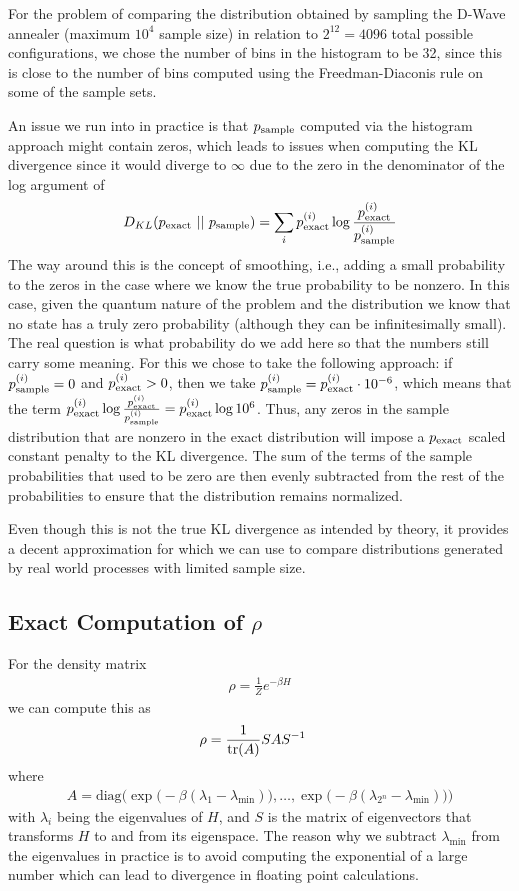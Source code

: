 For the problem of comparing the distribution obtained by sampling the D-Wave annealer (maximum \( 10^4 \) sample size) in relation to \( 2^{12} = 4096 \) total possible configurations, we chose the number of bins in the histogram to be 32, since this is close to the number of bins computed using the Freedman-Diaconis rule on some of the sample sets.

An issue we run into in practice is that \( p_{\text{sample}} \) computed via the histogram approach might contain zeros, which leads to issues when computing the KL divergence since it would diverge to \( \infty \) due to the zero in the denominator of the log argument of
\begin{align}
    D_{KL}(p_{\text{exact}} \ || \ p_{\text{sample}}) = \sum_i p_{\text{exact}}^{(i)} \log\frac{p_{\text{exact}}^{(i)}}{p_{\text{sample}}^{(i)}}
\end{align}
The way around this is the concept of smoothing, i.e., adding a small probability to the zeros in the case where we know the true probability to be nonzero.
In this case, given the quantum nature of the problem and the distribution we know that no state has a truly zero probability (although they can be infinitesimally small).
The real question is what probability do we add here so that the numbers still carry some meaning.
For this we chose to take the following approach: if \( p_{\text{sample}}^{(i)} = 0 \) and \( p_{\text{exact}}^{(i)} > 0 \), then we take \( p_{\text{sample}}^{(i)} = p_{\text{exact}}^{(i)} \cdot 10^{-6} \), which means that the term \( p_{\text{exact}}^{(i)} \log \frac{p_{\text{exact}}^{(i)}}{p_{\text{sample}}^{(i)}} = p_{\text{exact}}^{(i)} \log 10^6 \).
Thus, any zeros in the sample distribution that are nonzero in the exact distribution will impose a \( p_{\text{exact}} \) scaled constant penalty to the KL divergence.
The sum of the terms of the sample probabilities that used to be zero are then evenly subtracted from the rest of the probabilities to ensure that the distribution remains normalized.

Even though this is not the true KL divergence as intended by theory, it provides a decent approximation for which we can use to compare distributions generated by real world processes with limited sample size.

\subsection{Exact Computation of \( \rho \)}\label{app:exact_rho_computation}
For the density matrix
\begin{align}
    \rho = \frac{1}{Z} e^{-\beta H}
\end{align}
we can compute this as
\begin{align}
    \rho
        &= \frac{1}{\text{tr}(A)} S A S^{-1}
\end{align}
where
\begin{align}
    A = \text{diag}\Big(\exp\big(-\beta(\lambda_1 - \lambda_{\min})\big), \dots, \exp\big(-\beta(\lambda_{2^n} - \lambda_{\min})\big)\Big)
\end{align}
with \( \lambda_i \) being the eigenvalues of \( H \), and \( S \) is the matrix of eigenvectors that transforms \( H \) to and from its eigenspace.
The reason why we subtract \( \lambda_{\min} \) from the eigenvalues in practice is to avoid computing the exponential of a large number which can lead to divergence in floating point calculations.
